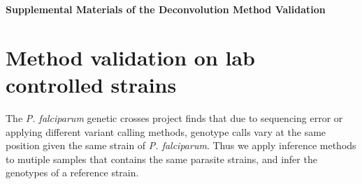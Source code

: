 

\begin{center}
\textbf{\large Supplemental Materials of the Deconvolution Method Validation}
\end{center}

\section{Method validation on lab controlled strains} \label{sup:sec:validate}


The {\em P. falciparum} genetic crosses project \citep{Miles2015:sup} finds that due to sequencing error or applying different variant calling methods, genotype calls vary at the same position given the same strain of {\em P. falciparum}. Thus we apply inference methods to mutiple samples that contains the same parasite strains, and infer the genotypes of a reference strain.


